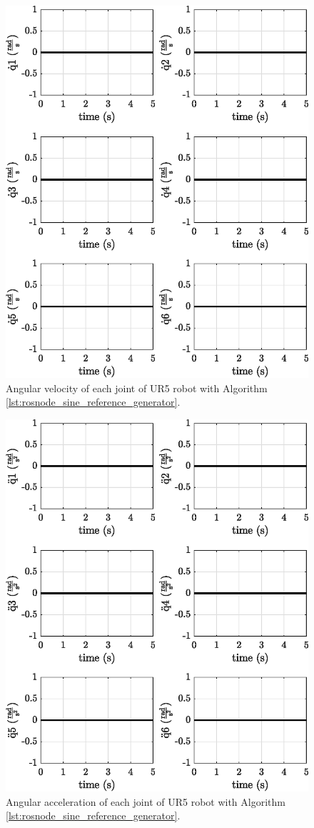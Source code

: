 \begin{figure}
    \centering
    \includegraphics{images/act_1.2/joint_velocity.eps}
    \caption{Angular velocity of each joint of UR5 robot with Algorithm \ref{lst:rosnode_sine_reference_generator}.}
    \label{fig:act_1.2_joint_velocity}
\end{figure}

\begin{figure}
    \centering
    \includegraphics{images/act_1.2/joint_acceleration.eps}
    \caption{Angular acceleration of each joint of UR5 robot with Algorithm \ref{lst:rosnode_sine_reference_generator}.}
    \label{fig:act_1.2_joint_acceleration}
\end{figure}